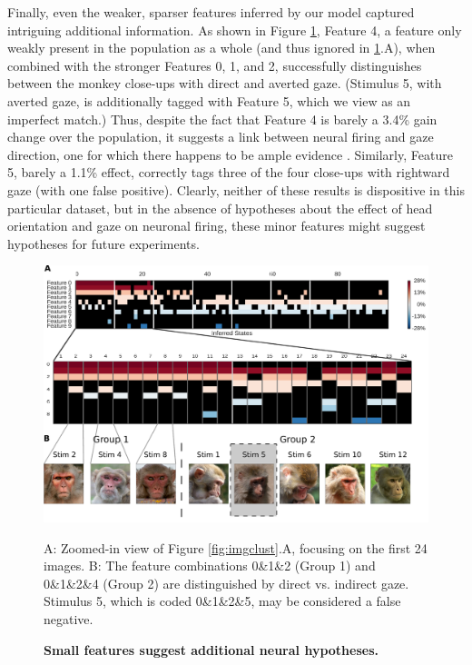 \documentclass[12pt,a4paper]{article}
\begin{document}
Finally, even the weaker, sparser features inferred by our model captured intriguing additional information. As shown in Figure \ref{fig:imgclust_sub}, Feature 4, a feature only weakly present in the population as a whole (and thus ignored in \ref{fig:imgclust_sub}.A), when combined with the stronger Features 0, 1, and 2, successfully distinguishes between the monkey close-ups with direct and averted gaze. (Stimulus 5, with averted gaze, is additionally tagged with Feature 5, which we view as an imperfect match.) Thus, despite the fact that Feature 4 is barely a 3.4\% gain change over the population, it suggests a link between neural firing and gaze direction, one for which there happens to be ample evidence \cite{Perrett23, Freiwald845}. Similarly, Feature 5, barely a 1.1\% effect, correctly tags three of the four close-ups with rightward gaze (with one false positive). Clearly, neither of these results is dispositive in this particular dataset, but in the absence of hypotheses about the effect of head orientation and gaze on neuronal firing, these minor features might suggest hypotheses for future experiments.

\begin{figure}[!ht]
    \includegraphics[width=\linewidth]{figures/imgclust_subgroups}
	\caption{\bf Small features suggest additional neural hypotheses.}
	A: Zoomed-in view of Figure \ref{fig:imgclust}.A, focusing on the first 24 images. B: The feature combinations 0\&1\&2 (Group 1) and 0\&1\&2\&4 (Group 2) are distinguished by direct vs. indirect gaze. Stimulus 5, which is coded 0\&1\&2\&5, may be considered a false negative.
	\label{fig:imgclust_sub}
\end{figure}
\end{document}
